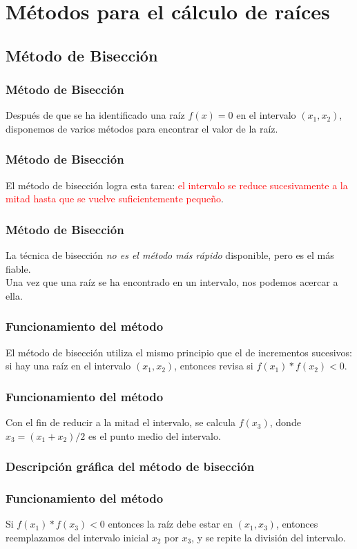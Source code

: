 \documentclass[12pt]{beamer}
\begin{document}
\section{Métodos para el cálculo de raíces}
\subsection{Método de Bisección}

\begin{frame}
\frametitle{Método de Bisección}
Después de que se ha identificado una raíz $ f(x) = 0$ en el intervalo $(x_{1}, x_{2})$, disponemos de varios métodos para encontrar el valor de la raíz.
\end{frame}
\begin{frame}
\frametitle{Método de Bisección}
El \textcolor{cadmiumgreen}{método de bisección} logra esta tarea: \pause \textcolor{red}{el intervalo se reduce sucesivamente a la mitad  hasta que se vuelve suficientemente pequeño}. 
\end{frame}
\begin{frame}
\frametitle{Método de Bisección}
La técnica de bisección \textit{no es el método más rápido} disponible, pero es el más fiable.
\\
\bigskip
\pause
Una vez que una raíz se ha encontrado en un intervalo, nos podemos acercar a ella.
\end{frame}
\begin{frame}
\frametitle{Funcionamiento del método}
El método de bisección utiliza el mismo principio que el de incrementos sucesivos: \pause si hay una raíz en el intervalo $(x_{1}, x_{2})$, entonces revisa si $f(x_{1}) * f(x_{2}) < 0$.
\end{frame}
\begin{frame}
\frametitle{Funcionamiento del método}
Con el fin de reducir a la mitad el intervalo, se calcula $f (x_{3})$, donde $x_{3} = (x_{1} + x_{2})/2$ es el punto medio del intervalo.
\end{frame}
\begin{frame}
\frametitle{Descripción gráfica del método de bisección}
\begin{figure}
	\centering
	
\end{figure}
\end{frame}
\begin{frame}
\frametitle{Funcionamiento del método}
Si $f (x_{1}) * f (x_{3}) < 0$ entonces la raíz debe estar en $(x_{1}, x_{3})$, \pause entonces reemplazamos del intervalo inicial $x_{2}$ por $x_{3}$, y se repite la división del intervalo.
\pause
\begin{figure}
	\centering
	
\end{figure}
\end{frame}
\end{document}
